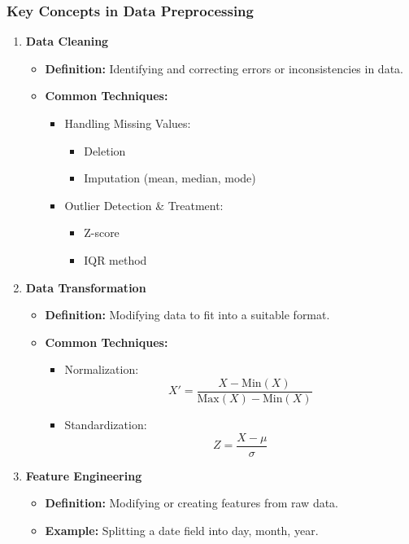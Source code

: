 \documentclass[aspectratio=169]{beamer}
\begin{document}
\begin{frame}[fragile]
    \frametitle{Key Concepts in Data Preprocessing}
    \begin{enumerate}
        \item \textbf{Data Cleaning}
            \begin{itemize}
                \item \textbf{Definition:} Identifying and correcting errors or inconsistencies in data.
                \item \textbf{Common Techniques:}
                \begin{itemize}
                    \item Handling Missing Values:
                        \begin{itemize}
                            \item Deletion
                            \item Imputation (mean, median, mode)
                        \end{itemize}
                    \item Outlier Detection \& Treatment:
                        \begin{itemize}
                            \item Z-score
                            \item IQR method
                        \end{itemize}
                \end{itemize}
            \end{itemize}
        
        \item \textbf{Data Transformation}
            \begin{itemize}
                \item \textbf{Definition:} Modifying data to fit into a suitable format.
                \item \textbf{Common Techniques:}
                \begin{itemize}
                    \item Normalization: 
                        \[
                        X' = \frac{X - \text{Min}(X)}{\text{Max}(X) - \text{Min}(X)}
                        \]
                    \item Standardization:
                        \[
                        Z = \frac{X - \mu}{\sigma}
                        \]
                \end{itemize}
            \end{itemize}
            
        \item \textbf{Feature Engineering}
            \begin{itemize}
                \item \textbf{Definition:} Modifying or creating features from raw data.
                \item \textbf{Example:} Splitting a date field into day, month, year.
            \end{itemize}
    \end{enumerate}
\end{frame}
\end{document}
